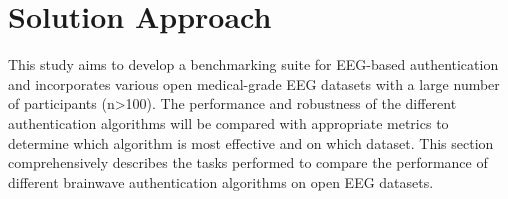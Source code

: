 \chapter{Solution Approach}
\label{ch:Solution Approach}

This study aims to develop a benchmarking suite for EEG-based authentication and incorporates various open medical-grade EEG datasets with a large number of participants (n>100). The performance and robustness of the different authentication algorithms will be compared with appropriate metrics to determine which algorithm is most effective and on which dataset. This section comprehensively describes the tasks performed to compare the performance of different brainwave authentication algorithms on open EEG datasets.

